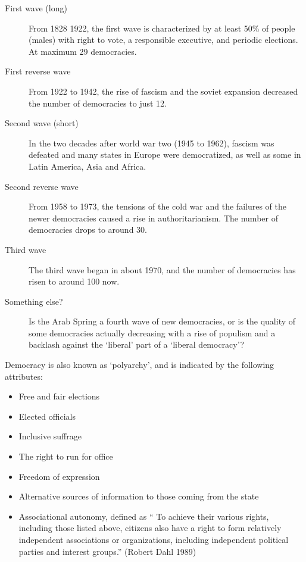 \begin{description}
\item[First wave (long)] From 1828 1922, the first wave is
  characterized by at least 50\% of people (males) with right to vote,
  a responsible executive, and periodic elections. At maximum 29
  democracies.
\item[First reverse wave] From 1922 to 1942, the rise of fascism and
  the soviet expansion decreased the number of democracies to just 12.
\item[Second wave (short)] In the two decades after world war two
  (1945 to 1962), fascism was defeated and many states in Europe were
  democratized, as well as some in Latin America, Asia and Africa.
\item[Second reverse wave] From 1958 to 1973, the tensions of the cold
  war and the failures of the newer democracies caused a rise in
  authoritarianism. The number of democracies drops to around 30.
\item[Third wave] The third wave began in about 1970, and the number
  of democracies has risen to around 100 now.
\item[Something else?] Is the Arab Spring a fourth wave of new
  democracies, or is the quality of some democracies actually
  decreasing with a rise of populism and a backlash against the
  `liberal' part of a `liberal democracy'?
\end{description}


Democracy is also known as `polyarchy', and is indicated by the
following attributes:

\begin{itemize}
\item Free and fair elections
\item Elected officials
\item Inclusive suffrage
\item The right to run for office
\item Freedom of expression
\item Alternative sources of information to those coming from the state
\item Associational autonomy, defined as `` To achieve their various
  rights, including those listed above, citizens also have a right to
  form relatively independent associations or organizations, including
  independent political parties and interest groups.'' (Robert Dahl
  1989)
\end{itemize}

